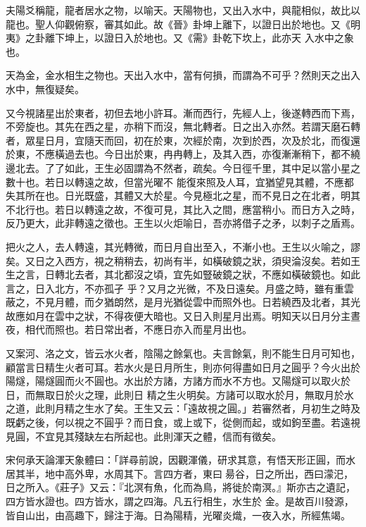 \begin{pinyinscope}
 夫陽爻稱龍，龍者居水之物，以喻天。天陽物也，又出入水中，與龍相似，故比以龍也。聖人仰觀俯察，審其如此。故《晉》卦坤上離下，以證日出於地也。又《明夷》之卦離下坤上，以證日入於地也。又《需》卦乾下坎上，此亦天
 入水中之象也。



 天為金，金水相生之物也。天出入水中，當有何損，而謂為不可乎？然則天之出入水中，無復疑矣。



 又今視諸星出於東者，初但去地小許耳。漸而西行，先經人上，後遂轉西而下焉，不旁旋也。其先在西之星，亦稍下而沒，無北轉者。日之出入亦然。若謂天磨石轉者，眾星日月，宜隨天而回，初在於東，次經於南，次到於西，次及於北，而復還於東，不應橫過去也。今日出於東，冉冉轉上，及其入西，亦復漸漸稍下，都不繞邊北去。了了如此，王生必固謂為不然者，疏矣。今日徑千里，其中足以當小星之數十也。若日以轉遠之故，但當光曜不
 能復來照及人耳，宜猶望見其體，不應都失其所在也。日光既盛，其體又大於星。今見極北之星，而不見日之在北者，明其不北行也。若日以轉遠之故，不復可見，其比入之間，應當稍小。而日方入之時，反乃更大，此非轉遠之徵也。王生以火炬喻日，吾亦將借子之矛，以刺子之盾焉。



 把火之人，去人轉遠，其光轉微，而日月自出至入，不漸小也。王生以火喻之，謬矣。又日之入西方，視之稍稍去，初尚有半，如橫破鏡之狀，須臾淪沒矣。若如王生之言，日轉北去者，其北都沒之頃，宜先如豎破鏡之狀，不應如橫破鏡也。如此言之，日入北方，不亦孤孑
 乎？又月之光微，不及日遠矣。月盛之時，雖有重雲蔽之，不見月體，而夕猶朗然，是月光猶從雲中而照外也。日若繞西及北者，其光故應如月在雲中之狀，不得夜便大暗也。又日入則星月出焉。明知天以日月分主晝夜，相代而照也。若日常出者，不應日亦入而星月出也。



 又案河、洛之文，皆云水火者，陰陽之餘氣也。夫言餘氣，則不能生日月可知也，顧當言日精生火者可耳。若水火是日月所生，則亦何得盡如日月之圓乎？今火出於陽燧，陽燧圓而火不圓也。水出於方諸，方諸方而水不方也。又陽燧可以取火於日，而無取日於火之理，此則日
 精之生火明矣。方諸可以取水於月，無取月於水之道，此則月精之生水了矣。王生又云：「遠故視之圓。」若審然者，月初生之時及既虧之後，何以視之不圓乎？而日食，或上或下，從側而起，或如鉤至盡。若遠視見圓，不宜見其殘缺左右所起也。此則渾天之體，信而有徵矣。



 宋何承天論渾天象體曰：「詳尋前說，因觀渾儀，研求其意，有悟天形正圓，而水居其半，地中高外卑，水周其下。言四方者，東曰昜谷，日之所出，西曰濛汜，日之所入。《莊子》又云：『北溟有魚，化而為鳥，將徙於南溟。』斯亦古之遺記，四方皆水證也。四方皆水，謂之四海。凡五行相生，水生於
 金。是故百川發源，皆自山出，由高趣下，歸注于海。日為陽精，光曜炎熾，一夜入水，所經焦竭。




\end{pinyinscope}
